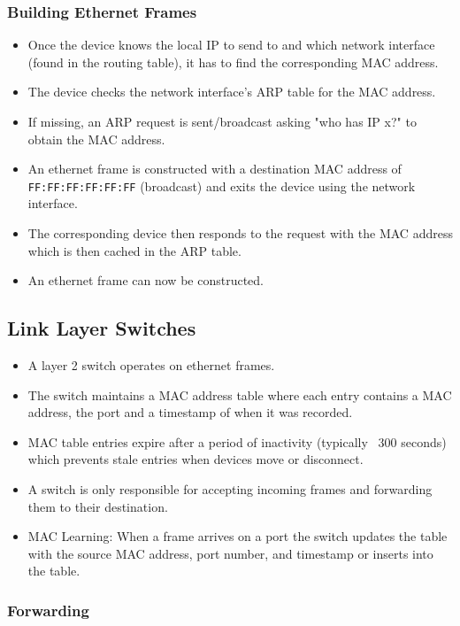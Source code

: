 \documentclass{article}
\begin{document}
\subsubsection{Building Ethernet Frames}

\begin{itemize}
    \item Once the device knows the local IP to send to and which network interface (found in the routing table), it has to find the corresponding MAC address.
    \item The device checks the network interface's ARP table for the MAC address.
    \item If missing, an ARP request is sent/broadcast asking "who has IP x?" to obtain the MAC address.
    \item An ethernet frame is constructed with a destination MAC address of \texttt{FF:FF:FF:FF:FF:FF} (broadcast) and exits the device using the network interface.
    \item The corresponding device then responds to the request with the MAC address which is then cached in the ARP table.
    \item An ethernet frame can now be constructed.
\end{itemize}

\subsection{Link Layer Switches}

\begin{itemize}
    \item A layer 2 switch operates on ethernet frames.
    \item The switch maintains a MAC address table where each entry contains a MAC address, the port and a timestamp of when it was recorded.
    \item MAC table entries expire after a period of inactivity (typically ~300 seconds) which prevents stale entries when devices move or disconnect.
    \item A switch is only responsible for accepting incoming frames and forwarding them to their destination.
    \item MAC Learning: When a frame arrives on a port the switch updates the table with the source MAC address, port number, and timestamp or inserts into the table.
\end{itemize}

\subsubsection{Forwarding}
\end{document}
